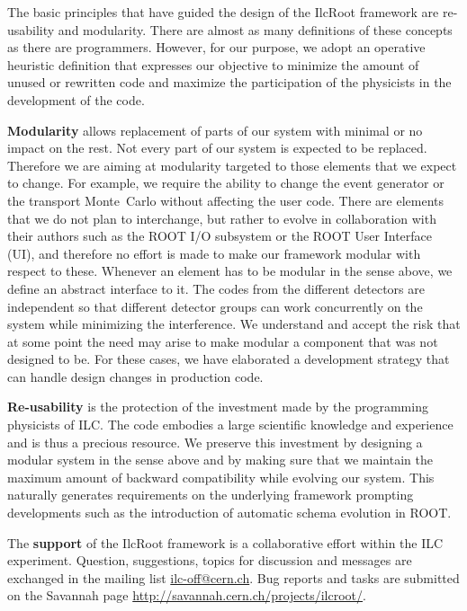 \documentclass[12pt,a4paper,twoside]{article}
\makeatletter
\newcommand {\MC} {Monte~Carlo\@\xspace}
\makeatother
\begin{document}
The  basic principles  that  have  guided the  design  of the  IlcRoot
framework are  re-usability and modularity.  There are almost  as many
definitions of  these concepts as there are  programmers. However, for
our purpose, we adopt an operative heuristic definition that expresses
our objective to  minimize the amount of unused  or rewritten code and
maximize the participation of the physicists in the development of the
code.

\textbf{Modularity}  allows replacement  of parts  of our  system with
minimal or  no impact  on the rest.  Not every  part of our  system is
expected  to  be  replaced.  Therefore  we are  aiming  at  modularity
targeted to those  elements that we expect to  change. For example, we
require the ability to change the event generator or the transport \MC
without affecting  the user  code. There are  elements that we  do not
plan to interchange, but rather  to evolve in collaboration with their
authors  such as the  ROOT I/O  subsystem or  the ROOT  User Interface
(UI), and  therefore no effort is  made to make  our framework modular
with respect  to these. Whenever an  element has to be  modular in the
sense above, we define an abstract interface to it. The codes from the
different detectors are independent  so that different detector groups
can   work   concurrently  on   the   system   while  minimizing   the
interference. We understand and accept the risk that at some point the
need may  arise to make modular  a component that was  not designed to
be. For  these cases, we  have elaborated a development  strategy that
can handle design changes in production code.

\textbf{Re-usability} is the protection  of the investment made by the
programming physicists of ILC.  The code embodies a large scientific
knowledge and experience and is  thus a precious resource. We preserve
this investment by  designing a modular system in  the sense above and
by  making  sure that  we  maintain  the  maximum amount  of  backward
compatibility  while evolving  our system.   This  naturally generates
requirements on  the underlying framework  prompting developments such
as the introduction of automatic schema evolution in ROOT.

The \textbf{support} of the IlcRoot framework is a collaborative effort
within  the  ILC   experiment.  Question,  suggestions,  topics  for
discussion   and  messages   are   exchanged  in   the  mailing   list
\url{ilc-off@cern.ch}. Bug  reports and  tasks are submitted  on the
Savannah page \url{http://savannah.cern.ch/projects/ilcroot/}.
\end{document}
